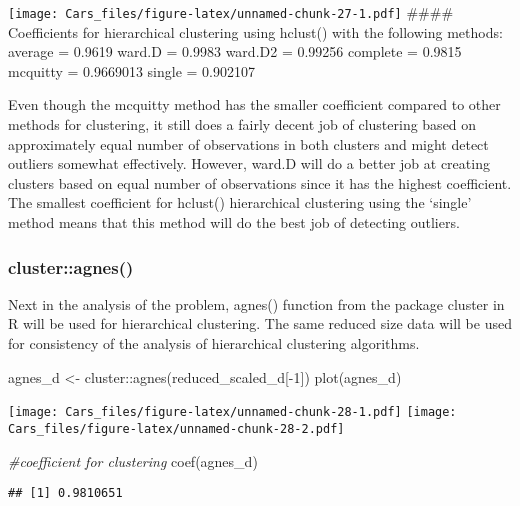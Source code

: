 \documentclass[
]{article}
\newenvironment{Shaded}{\begin{snugshade}}{\end{snugshade}}
\newcommand{\CommentTok}[1]{\textcolor[rgb]{0.56,0.35,0.01}{\textit{#1}}}
\newcommand{\DecValTok}[1]{\textcolor[rgb]{0.00,0.00,0.81}{#1}}
\newcommand{\FunctionTok}[1]{\textcolor[rgb]{0.00,0.00,0.00}{#1}}
\newcommand{\NormalTok}[1]{#1}
\newcommand{\OtherTok}[1]{\textcolor[rgb]{0.56,0.35,0.01}{#1}}
\newcommand{\SpecialCharTok}[1]{\textcolor[rgb]{0.00,0.00,0.00}{#1}}
\begin{document}
\texttt{[image: Cars\_files/figure-latex/unnamed-chunk-27-1.pdf]}
\#\#\#\# Coefficients for hierarchical clustering using hclust() with
the following methods: average = 0.9619 ward.D = 0.9983 ward.D2 =
0.99256 complete = 0.9815 mcquitty = 0.9669013 single = 0.902107

Even though the mcquitty method has the smaller coefficient compared to
other methods for clustering, it still does a fairly decent job of
clustering based on approximately equal number of observations in both
clusters and might detect outliers somewhat effectively. However, ward.D
will do a better job at creating clusters based on equal number of
observations since it has the highest coefficient. The smallest
coefficient for hclust() hierarchical clustering using the `single'
method means that this method will do the best job of detecting
outliers.

\hypertarget{clusteragnes}{%
\subsubsection{cluster::agnes()}\label{clusteragnes}}

Next in the analysis of the problem, agnes() function from the package
cluster in R will be used for hierarchical clustering. The same reduced
size data will be used for consistency of the analysis of hierarchical
clustering algorithms.

\begin{Shaded}
\begin{Highlighting}[]
\NormalTok{agnes\_d }\OtherTok{\textless{}{-}}\NormalTok{ cluster}\SpecialCharTok{::}\FunctionTok{agnes}\NormalTok{(reduced\_scaled\_d[}\SpecialCharTok{{-}}\DecValTok{1}\NormalTok{])}
\FunctionTok{plot}\NormalTok{(agnes\_d)}
\end{Highlighting}
\end{Shaded}

\texttt{[image: Cars\_files/figure-latex/unnamed-chunk-28-1.pdf]}
\texttt{[image: Cars\_files/figure-latex/unnamed-chunk-28-2.pdf]}

\begin{Shaded}
\begin{Highlighting}[]
\CommentTok{\#coefficient for clustering}
\FunctionTok{coef}\NormalTok{(agnes\_d)}
\end{Highlighting}
\end{Shaded}

\begin{verbatim}
## [1] 0.9810651
\end{verbatim}
\end{document}
